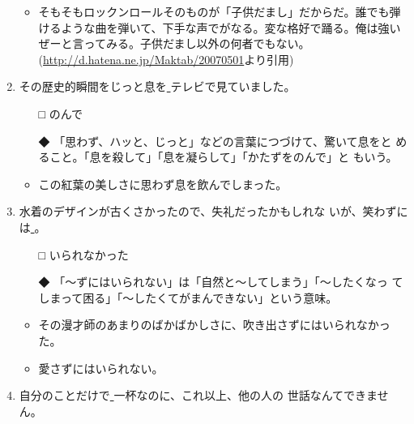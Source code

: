 \documentclass[
uplatex,
b5paper,
10pt,
dvipdfmx
]{jsbook}
\begin{document}
\begin{enumerate}
 \begin{itemize}
  \item そもそもロックンロールそのものが「子供だまし」だからだ。誰でも弾
	けるような曲を弾いて、下手な声でがなる。変な格好で踊る。俺は強い
	ぜーと言ってみる。子供だまし以外の何者でもない。
       (\url{http://d.hatena.ne.jp/Maktab/20070501}より引用)
 \end{itemize}


 \item その歴史的瞬間をじっと息を\underline{   }テレビで見ていました。

 \begin{itemize}
  \item[□] のんで
  \item[◆] 「思わず、ハッと、じっと」などの言葉につづけて、驚いて息をと
	    めること。「息を殺して」「息を凝らして」「かたずをのんで」と
	    もいう。
 \end{itemize}

 \begin{itemize}
  \item この紅葉の美しさに思わず息を飲んでしまった。
 \end{itemize}

 \item 水着のデザインが古くさかったので、失礼だったかもしれな
       いが、笑わずには\underline{   }。


 \begin{itemize}
  \item[□] いられなかった
  \item[◆] 「〜ずにはいられない」は「自然と〜してしまう」「〜したくなっ
	    てしまって困る」「〜したくてがまんできない」という意味。
 \end{itemize}

 \begin{itemize}
  \item その漫才師のあまりのばかばかしさに、吹き出さずにはいられなかった。
  \item 愛さずにはいられない。
 \end{itemize}


 \item 自分のことだけで\underline{   }一杯なのに、これ以上、他の人の
       世話なんてできません。


\end{enumerate}
\end{document}
